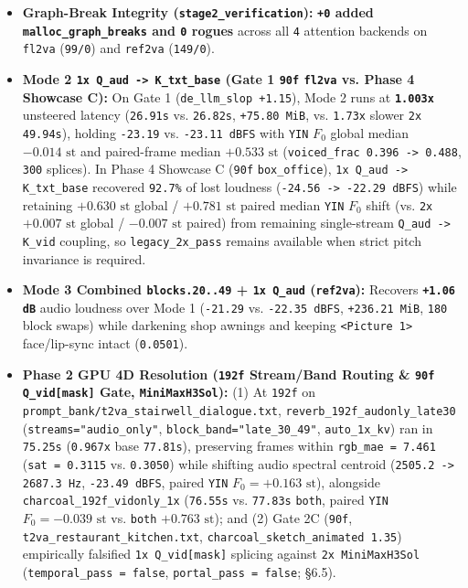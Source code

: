 \documentclass[10pt]{article}
\begin{document}
\begin{itemize}[leftmargin=*]
\item \textbf{Graph-Break Integrity (\texttt{stage2\_verification}):} \textbf{\texttt{+0} added \texttt{malloc\_graph\_breaks} and \texttt{0} rogues} across all \texttt{4} attention backends on \texttt{fl2va} (\texttt{99/0}) and \texttt{ref2va} (\texttt{149/0}).
\item \textbf{Mode 2 \texttt{1x Q\_aud -> K\_txt\_base} (Gate 1 \texttt{90f} \texttt{fl2va} vs. Phase 4 Showcase C):} On Gate 1 (\texttt{de\_llm\_slop +1.15}), Mode 2 runs at \textbf{\texttt{1.003x}} unsteered latency (\texttt{26.91s} vs. \texttt{26.82s}, \texttt{+75.80 MiB}, vs. \texttt{1.73x} slower \texttt{2x} \texttt{49.94s}), holding \texttt{-23.19} vs. \texttt{-23.11 dBFS} with \texttt{YIN} $F_0$ global median $-0.014\text{ st}$ and paired-frame median $+0.533\text{ st}$ (\texttt{voiced\_frac 0.396 -> 0.488}, \texttt{300} splices). In Phase 4 Showcase C (\texttt{90f} \texttt{box\_office}), \texttt{1x Q\_aud -> K\_txt\_base} recovered \texttt{92.7\%} of lost loudness (\texttt{-24.56 -> -22.29 dBFS}) while retaining $+0.630\text{ st}$ global / $+0.781\text{ st}$ paired median \texttt{YIN} $F_0$ shift (vs. \texttt{2x} $+0.007\text{ st}$ global / $-0.007\text{ st}$ paired) from remaining single-stream \texttt{Q\_aud -> K\_vid} coupling, so \texttt{legacy\_2x\_pass} remains available when strict pitch invariance is required.
\item \textbf{Mode 3 Combined \texttt{blocks.20..49} + \texttt{1x Q\_aud} (\texttt{ref2va}):} Recovers \textbf{\texttt{+1.06 dB}} audio loudness over Mode 1 (\texttt{-21.29} vs. \texttt{-22.35 dBFS}, \texttt{+236.21 MiB}, \texttt{180} block swaps) while darkening shop awnings and keeping \texttt{<Picture 1>} face/lip-sync intact (\texttt{0.0501}).
\item \textbf{Phase 2 GPU 4D Resolution (\texttt{192f} Stream/Band Routing \& \texttt{90f} \texttt{Q\_vid[mask]} Gate, \texttt{MiniMaxH3Sol}):} (1) At \texttt{192f} on \texttt{prompt\_bank/t2va\_stairwell\_dialogue.txt}, \texttt{reverb\_192f\_audonly\_late30} (\texttt{streams="audio\_only"}, \texttt{block\_band="late\_30\_49"}, \texttt{auto\_1x\_kv}) ran in \texttt{75.25s} (\texttt{0.967x} base \texttt{77.81s}), preserving frames within \texttt{rgb\_mae = 7.461} (\texttt{sat = 0.3115} vs. \texttt{0.3050}) while shifting audio spectral centroid (\texttt{2505.2 -> 2687.3 Hz}, \texttt{-23.49 dBFS}, paired \texttt{YIN} $F_0 = +0.163\text{ st}$), alongside \texttt{charcoal\_192f\_vidonly\_1x} (\texttt{76.55s} vs. \texttt{77.83s} \texttt{both}, paired \texttt{YIN} $F_0 = -0.039\text{ st}$ vs. \texttt{both} $+0.763\text{ st}$); and (2) Gate 2C (\texttt{90f}, \texttt{t2va\_restaurant\_kitchen.txt}, \texttt{charcoal\_sketch\_animated 1.35}) empirically falsified \texttt{1x Q\_vid[mask]} splicing against \texttt{2x MiniMaxH3Sol} (\texttt{temporal\_pass = false}, \texttt{portal\_pass = false}; \S{}6.5).
\end{itemize}
\end{document}
